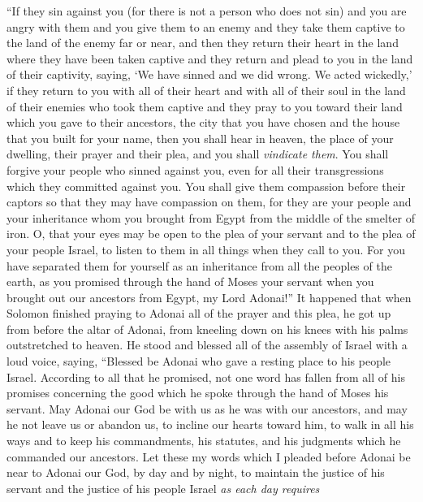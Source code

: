 \begin{biblechapter}
\verse “If they sin against you (for there is not a person who does not sin) and you are angry with them and you give them to an enemy and they take them captive to the land of the enemy far or near,
\verse and then they return their heart in the land where they have been taken captive and they return and plead to you in the land of their captivity, saying, ‘We have sinned and we did wrong. We acted wickedly,’
\verse if they return to you with all of their heart and with all of their soul in the land of their enemies who took them captive and they pray to you toward their land which you gave to their ancestors, the city that you have chosen and the house that you built for your name,
\verse then you shall hear in heaven, the place of your dwelling, their prayer and their plea, and you shall \textit{vindicate them}.
\verse You shall forgive your people who sinned against you, even for all their transgressions which they committed against you. You shall give them compassion before their captors so that they may have compassion on them,
\verse for they are your people and your inheritance whom you brought from Egypt from the middle of the smelter of iron.
\verse O, that your eyes may be open to the plea of your servant and to the plea of your people Israel, to listen to them in all things when they call to you.
\verse For you have separated them for yourself as an inheritance from all the peoples of the earth, as you promised through the hand of Moses your servant when you brought out our ancestors from Egypt, my Lord Adonai!”
 It happened that when Solomon finished praying to Adonai all of the prayer and this plea, he got up from before the altar of Adonai, from kneeling down on his knees with his palms outstretched to heaven.
\verse He stood and blessed all of the assembly of Israel with a loud voice, saying,
\verse “Blessed be Adonai who gave a resting place to his people Israel. According to all that he promised, not one word has fallen from all of his promises concerning the good which he spoke through the hand of Moses his servant.
\verse May Adonai our God be with us as he was with our ancestors, and may he not leave us or abandon us,
\verse to incline our hearts toward him, to walk in all his ways and to keep his commandments, his statutes, and his judgments which he commanded our ancestors.
\verse Let these my words which I pleaded before Adonai be near to Adonai our God, by day and by night, to maintain the justice of his servant and the justice of his people Israel \textit{as each day requires}

\end{biblechapter}
